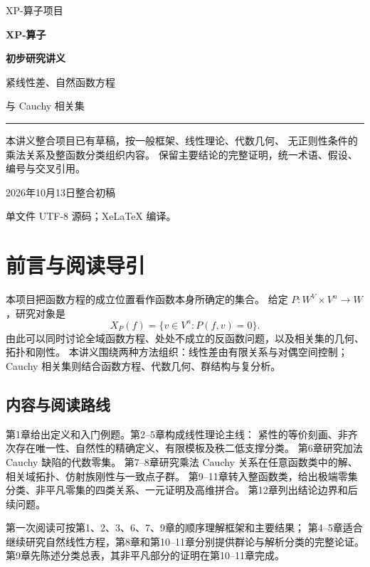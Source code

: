 \documentclass[11pt,a4paper,oneside,openany]{book}
\theoremstyle{lecture}
\numberwithin{equation}{section}
\begin{document}
\frontmatter
\begin{titlepage}
\vspace*{18mm}
{\large\color{MidnightBlue} XP-算子项目\par}
\vspace{14mm}
{\Huge\bfseries XP-算子\par}
\vspace{4mm}
{\Huge\bfseries 初步研究讲义\par}
\vspace{12mm}
{\Large 紧线性差、自然函数方程\par}
\vspace{2mm}
{\Large 与 Cauchy 相关集\par}
\vspace{13mm}
\noindent\rule{\textwidth}{.6pt}
\vspace{6mm}
\noindent 本讲义整合项目已有草稿，按一般框架、线性理论、代数几何、
无正则性条件的乘法关系及整函数分类组织内容。
保留主要结论的完整证明，统一术语、假设、编号与交叉引用。
\vfill
{\large 2026年10月13日\quad 整合初稿\par}
\vspace{4mm}
{\small 单文件 UTF-8 源码；XeLaTeX 编译。\par}
\end{titlepage}
\chapter*{前言与阅读导引}
本项目把函数方程的成立位置看作函数本身所确定的集合。
给定 $P:W^V\times V^n\to W$，研究对象是
\[
 X_P(f)=\{v\in V^n:P(f,v)=0\}.
\]
由此可以同时讨论全域函数方程、处处不成立的反函数问题，以及相关集的几何、拓扑和刚性。
本讲义围绕两种方法组织：线性差由有限关系与对偶空间控制；
Cauchy 相关集则结合函数方程、代数几何、群结构与复分析。

\section*{内容与阅读路线}
第1章给出定义和入门例题。第2--5章构成线性理论主线：
紧性的等价刻画、非齐次存在唯一性、自然性的精确定义、有限模板及秩二低支撑分类。
第6章研究加法 Cauchy 缺陷的代数零集。
第7--8章研究乘法 Cauchy 关系在任意函数类中的解、相关域拓扑、仿射族刚性与一致点子群。
第9--11章转入整函数类，给出极端零集分类、非平凡零集的四类关系、一元证明及高维拼合。
第12章列出结论边界和后续问题。

第一次阅读可按第1、2、3、6、7、9章的顺序理解框架和主要结果；
第4--5章适合继续研究自然线性方程，第8章和第10--11章分别提供群论与解析分类的完整论证。
第9章先陈述分类总表，其非平凡部分的证明在第10--11章完成。
\end{document}
